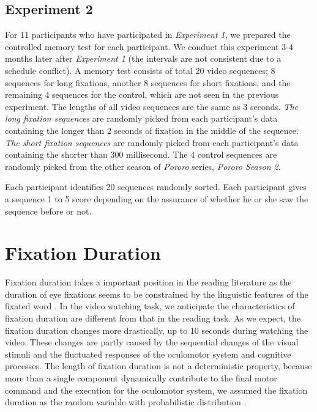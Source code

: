 \documentclass[10pt,letterpaper]{article}
\begin{document}
\subsection{Experiment 2}

For 11 participants who have participated in \textit{Experiment 1}, we prepared the controlled memory test for each participant. We conduct this experiment 3-4 months later after \textit{Experiment 1} (the intervals are not consistent due to a schedule conflict). A memory test consists of total 20 video sequences; 8 sequences for long fixations, another 8 sequences for short fixations, and the remaining 4 sequences for the control, which are not seen in the previous experiment. The lengths of all video sequences are the same as 3 seconds. \textit{The long fixation sequences} are randomly picked from each participant's data containing the longer than 2 seconds of fixation in the middle of the sequence. \textit{The short fixation sequences} are randomly picked from each participant's data containing the shorter than 300 millisecond. The 4 control sequences are randomly picked from the other season of \textit{Pororo} series, \textit{Pororo Season 2}.

Each participant identifies 20 sequences randomly sorted. Each participant gives a sequence 1 to 5 score depending on the assurance of whether he or she saw the sequence before or not. 

\section{Fixation Duration}
\label{sec:fixation-duration}

Fixation duration takes a important position in the reading literature as the duration of eye fixations seems to be constrained by the linguistic features of the fixated word \cite{Rayner1998}. In the video watching task, we anticipate the characteristics of fixation duration are different from that in the reading task. As we expect, the fixation duration changes more drastically, up to 10 seconds during watching the video. These changes are partly caused by the sequential changes of the visual stimuli and the fluctuated responses of the oculomotor system and cognitive processes. The length of fixation duration is not a deterministic property, because more than a single component dynamically contribute to the final motor command and the execution for the oculomotor system, we assumed the fixation duration as the random variable with probabilistic distribution \cite{Rayner1998,Reichle2004,Reichle2006}.
\end{document}
